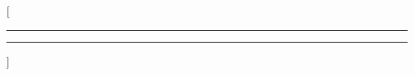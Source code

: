 \newcommand{\ModernRule}{%
  \noindent\textcolor{accentsoft}{\rule{\textwidth}{2pt}}%
  \nobreak\hspace{-\textwidth}\nobreak\textcolor{accent}{\rule{0.32\textwidth}{2pt}}}
\titleformat{\section}{\color{accent}\bfseries\fontsize{9.8}{11.2}\selectfont\filright}{}{0pt}{}%
  [\vspace{0.5pt}\ModernRule]
\titlespacing*{\section}{0pt}{4pt}{1pt}

\newcommand{\ResumeParagraph}[1]{\noindent #1\par}
\newcommand{\ResumeEntryHead}[2]{\noindent{\color{ink}\bfseries #1}\hfill{\color{accent}\bfseries #2}\par}
\newcommand{\ResumeEntrySub}[2]{\noindent{\itshape #1}\hfill #2\par}
\newcommand{\ResumeSkillLine}[2]{\noindent{\color{accent}\bfseries #1}\hspace{0.4em}#2\par}
\newcommand{\ResumeProjectHead}[2]{\needspace{2\baselineskip}\noindent{\color{ink}\bfseries #1}%
  \hfill{\color{accent}\itshape\small #2}\par}
\newcommand{\ResumeProjectDesc}[1]{\noindent #1\par}
\newcommand{\ResumeSoftSkills}[1]{\noindent #1\par}

\newenvironment{resumebullets}%
  {\begin{itemize}[leftmargin=12pt,itemsep=0pt,topsep=0pt,parsep=0pt,partopsep=0pt,
    label=\textcolor{accent}{\textbullet}]}%
  {\end{itemize}}

\newenvironment{resumeskills}%
  {\setlength{\parskip}{0.8pt}}%
  {}